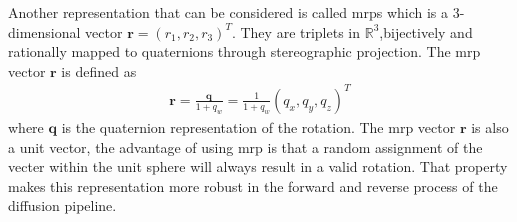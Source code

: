 \documentclass[12pt,DIV14,BCOR12mm,a4paper,footinclude=false,headinclude,parskip=half-,twoside,openright,cleardoublepage=empty,toc=index,bibliography=totoc,listof=totoc]{scrreprt}
\numberwithin{equation}{chapter}
\begin{document}
Another representation that can be considered is called \glspl{mrp} which is a 3-dimensional vector $\mathbf{r} = (r_{1}, r_{2}, r_{3})^{T}$. They are triplets in $\mathbb{R}^{3} $,bijectively and rationally mapped to quaternions through stereographic projection\cite{rodrigues}. The \gls{mrp} vector $\mathbf{r}$ is defined as
\begin{align}
  \mathbf{r} = \frac{\mathbf{q}}{1+q_{w}} = \frac{1}{1+q_{w}}(q_{x}, q_{y}, q_{z})^{T}
\end{align}
where $\mathbf{q}$ is the quaternion representation of the rotation. The \gls{mrp} vector $\mathbf{r}$ is also a unit vector, the advantage of using \gls{mrp} is that a random assignment of the vecter within the unit sphere will always result in a valid rotation. That property makes this representation more robust in the forward and reverse process of the diffusion pipeline.
\end{document}
